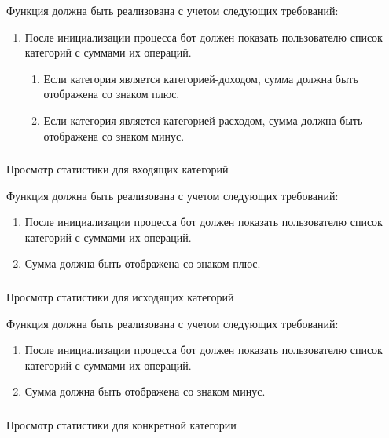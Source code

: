 Функция должна быть реализована с учетом следующих требований:

\begin{enumerate}
	\item После инициализации процесса бот должен показать пользователю список категорий с суммами их операций.
	\begin{enumerate}
		\item Если категория является категорией-доходом, сумма должна быть отображена со знаком плюс.
		\item Если категория является категорией-расходом, сумма должна быть отображена со знаком минус.
	\end{enumerate}
\end{enumerate}

\subsubsection{} Просмотр статистики для входящих категорий
\label{sec:domain:specification:showincomestats}

Функция должна быть реализована с учетом следующих требований:

\begin{enumerate}
	\item После инициализации процесса бот должен показать пользователю список категорий с суммами их операций.
	\item Сумма должна быть отображена со знаком плюс.
\end{enumerate}

\subsubsection{} Просмотр статистики для исходящих категорий
\label{sec:domain:specification:showexpensestats}

Функция должна быть реализована с учетом следующих требований:

\begin{enumerate}
	\item После инициализации процесса бот должен показать пользователю список категорий с суммами их операций.
	\item Сумма должна быть отображена со знаком минус.
\end{enumerate}

\subsubsection{} Просмотр статистики для конкретной категории
\label{sec:domain:specification:showcustomcategorystats}

